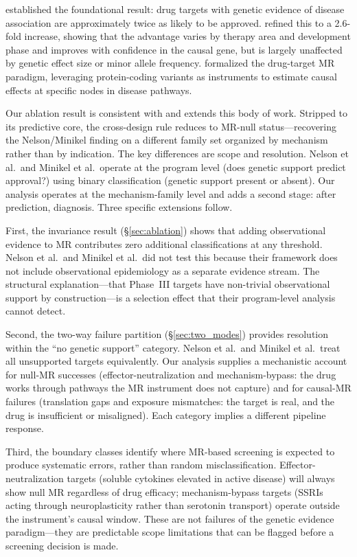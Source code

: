 \documentclass[11pt]{article}
\begin{document}
\citet{nelson2015} established the foundational result: drug targets with genetic evidence of disease association are approximately twice as likely to be approved. \citet{minikel2024} refined this to a 2.6-fold increase, showing that the advantage varies by therapy area and development phase and improves with confidence in the causal gene, but is largely unaffected by genetic effect size or minor allele frequency. \citet{gill2021} formalized the drug-target MR paradigm, leveraging protein-coding variants as instruments to estimate causal effects at specific nodes in disease pathways.

Our ablation result is consistent with and extends this body of work. Stripped to its predictive core, the cross-design rule reduces to MR-null status---recovering the Nelson/Minikel finding on a different family set organized by mechanism rather than by indication. The key differences are scope and resolution. Nelson et al.\ and Minikel et al.\ operate at the program level (does genetic support predict approval?) using binary classification (genetic support present or absent). Our analysis operates at the mechanism-family level and adds a second stage: after prediction, diagnosis. Three specific extensions follow.

First, the invariance result (\S\ref{sec:ablation}) shows that adding observational evidence to MR contributes zero additional classifications at any threshold. Nelson et al.\ and Minikel et al.\ did not test this because their framework does not include observational epidemiology as a separate evidence stream. The structural explanation---that Phase~III targets have non-trivial observational support by construction---is a selection effect that their program-level analysis cannot detect.

Second, the two-way failure partition (\S\ref{sec:two_modes}) provides resolution within the ``no genetic support'' category. Nelson et al.\ and Minikel et al.\ treat all unsupported targets equivalently. Our analysis supplies a mechanistic account for null-MR successes (effector-neutralization and mechanism-bypass: the drug works through pathways the MR instrument does not capture) and for causal-MR failures (translation gaps and exposure mismatches: the target is real, and the drug is insufficient or misaligned). Each category implies a different pipeline response.

Third, the boundary classes identify where MR-based screening is expected to produce systematic errors, rather than random misclassification. Effector-neutralization targets (soluble cytokines elevated in active disease) will always show null MR regardless of drug efficacy; mechanism-bypass targets (SSRIs acting through neuroplasticity rather than serotonin transport) operate outside the instrument's causal window. These are not failures of the genetic evidence paradigm---they are predictable scope limitations that can be flagged before a screening decision is made.
\end{document}
